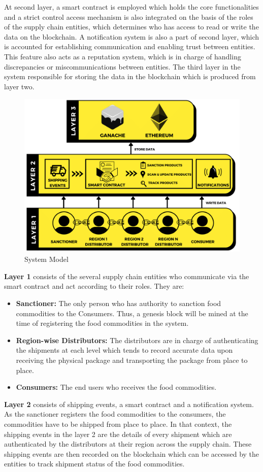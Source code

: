 \documentclass[12pt,a4paper,twocolumn,fleqn]{article}
\begin{document}
At second layer, a smart contract is employed which holds the core functionalities and a strict control access mechanism is also integrated on the basis of the roles of the supply chain entities, which determines who has access to read or write the data on the blockchain. A notification system is also a part of second layer, which is accounted for establishing communication and enabling trust between entities. This feature also acts as a reputation system, which is in charge of handling discrepancies or miscommunications between entities. The third layer in the system responsible for storing the data in the blockchain which is produced from layer two.
\begin{figure} [H]
\includegraphics[width=12cm,height=8cm]{media/System_model.png}
\centering
\caption{System Model}
\end{figure}
\textbf{Layer 1} consists of the several supply chain entities who communicate via the smart contract and act according to their roles. They are:
\begin{itemize}
    \item \textbf{Sanctioner:} The only person who has authority to sanction food commodities to the Consumers. Thus, a genesis block will be mined at the time of registering the food commodities in the system.
    \item \textbf{Region-wise Distributors:} The distributors are in charge of authenticating the shipments at each level which tends to record accurate data upon receiving the physical package and transporting the package from place to place. 
    \item \textbf{Consumers:} The end users who receives the food commodities.
\end{itemize}

\textbf{Layer 2}  consists of shipping events, a smart contract and a notification system. 
As the sanctioner registers the food commodities to the consumers, the commodities have to be shipped from place to place. In that context, the shipping events in the layer 2 are the details of every shipment which are authenticated by the distributors at their region across the supply chain. These shipping events are then recorded on the blockchain which can be accessed by the entities to track shipment status of the food commodities. 
\end{document}
